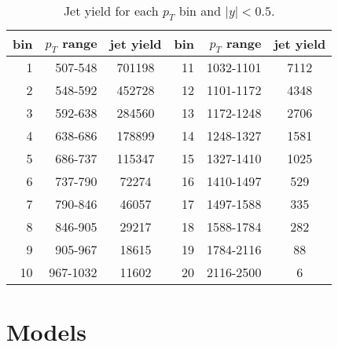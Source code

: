 \documentclass[aps,prd,preprint,nofootinbib]{revtex4}
\begin{document}
\begin{table}[htp]
\caption{Jet yield for each $p_T$ bin and $|y| < 0.5$.}
\label{tab:yield}
\medskip
 \begin{tabular}{|r||r|c|r|r|c|}
 \hline
 bin	&	$p_T$ range	& jet yield &  bin	&	$p_T$ range	& jet yield \\ \hline
 \hline
1	& 507-548 	& 701198	& 11	& 1032-1101 	& 7112\\ \hline
2	& 548-592  	& 452728	& 12	& 1101-1172 	& 4348\\ \hline 
3	& 592-638 	& 284560	& 13	& 1172-1248 	& 2706\\ \hline
4	& 638-686	& 178899	& 14	& 1248-1327 	& 1581\\ \hline
5	& 686-737	& 115347	& 15	& 1327-1410	& 1025\\ \hline 
6	& 737-790	& 72274	& 16	& 1410-1497 	& 529\\ \hline 
7	& 790-846	& 46057	& 17	& 1497-1588 	& 335\\ \hline
8	& 846-905 	& 29217	& 18	& 1588-1784 	& 282\\ \hline
9	& 905-967 	& 18615	& 19	& 1784-2116 	& 88\\ \hline
10	& 967-1032 	& 11602 	& 20	& 2116-2500	&6\\ \hline
\end{tabular}
\end{table}


\section{Models}
\end{document}
